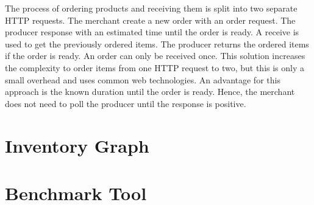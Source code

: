 The process of ordering products and receiving them is split into two separate HTTP requests.
The merchant create a new order with an order request.
The producer response with an estimated time until the order is ready.
A receive is used to get the previously ordered items.
The producer returns the ordered items if the order is ready.
An order can only be received once.
This solution increases the complexity to order items from one HTTP request to two, but this is only a small overhead and uses common web technologies.
An advantage for this approach is the known duration until the order is ready.
Hence, the merchant does not need to poll the producer until the response is positive.

\section{Inventory Graph}
\label{section:inventory_graph}

\section{Benchmark Tool}
\label{section:benchmark_tool}

